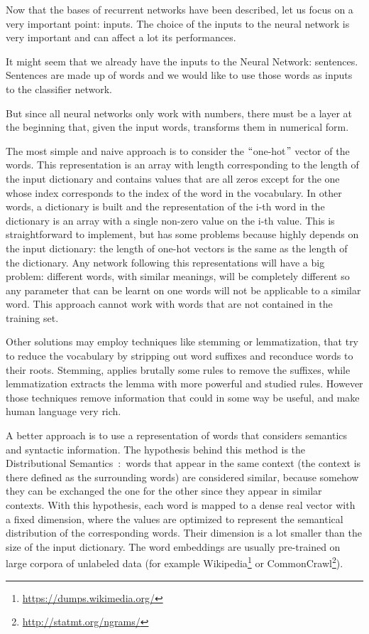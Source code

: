 Now that the bases of recurrent networks have been described, let us focus on a very important point: inputs. The choice of the inputs to the neural network is very important and can affect a lot its performances.

It might seem that we already have the inputs to the Neural Network: sentences. Sentences are made up of words and we would like to use those words as inputs to the classifier network.

But since all neural networks only work with numbers, there must be a layer at the beginning that, given the input words, transforms them in numerical form.

The most simple and naive approach is to consider the $``$one-hot$"$  vector of the words. This representation is an array with length corresponding to the length of the input dictionary and contains values that are all zeros except for the one whose index corresponds to the index of the word in the vocabulary. In other words, a dictionary is built and the representation of the i-th word in the dictionary is an array with a single non-zero value on the i-th value. This is straightforward to implement, but has some problems because highly depends on the input dictionary: the length of one-hot vectors is the same as the length of the dictionary. Any network following this representations will have a big problem: different words, with similar meanings, will be completely different so any parameter that can be learnt on one words will not be applicable to a similar word. This approach cannot work with words that are not contained in the training set.

Other solutions may employ techniques like stemming or lemmatization, that try to reduce the vocabulary by stripping out word suffixes and reconduce words to their roots. Stemming, applies brutally some rules to remove the suffixes, while lemmatization extracts the lemma with more powerful and studied rules. However those techniques remove information that could in some way be useful, and make human language very rich.

A better approach is to use a representation of words that considers semantics and syntactic information. The hypothesis behind this method is the Distributional Semantics~\cite{sahlgren2008distributional}:\ words that appear in the same context (the context is there defined as the surrounding words) are considered similar, because somehow they can be exchanged the one for the other since they appear in similar contexts. With this hypothesis, each word is mapped to a dense real vector with a fixed dimension,  where the values are optimized to represent the semantical distribution of the corresponding words. Their dimension is a lot smaller than the size of the input dictionary. The word embeddings are usually pre-trained on large corpora of unlabeled data (for example Wikipedia\footnote{\url{https://dumps.wikimedia.org/}} or CommonCrawl\footnote{\url{http://statmt.org/ngrams/}}).

